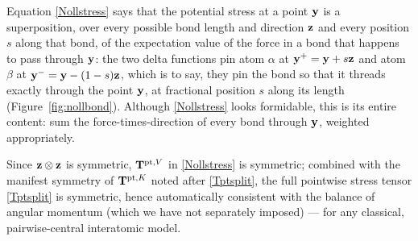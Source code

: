 \begin{remark}
	Equation \eqref{Nollstress} says that the potential stress at a point $\mathbf{y}$ is a superposition, over every possible bond length and direction $\mathbf{z}$ and every position $s$ along that bond, of the expectation value of the force in a bond that happens to pass through $\mathbf{y}$: the two delta functions pin atom $\alpha$ at $\mathbf{y}^+=\mathbf{y}+s\mathbf{z}$ and atom $\beta$ at $\mathbf{y}^-=\mathbf{y}-(1-s)\mathbf{z}$, which is to say, they pin the bond so that it threads exactly through the point $\mathbf{y}$, at fractional position $s$ along its length (Figure~\ref{fig:nollbond}). Although \eqref{Nollstress} looks formidable, this is its entire content: sum the force-times-direction of every bond through $\mathbf{y}$, weighted appropriately.
\end{remark}

\begin{remark}[Symmetry]
	Since $\mathbf{z}\otimes\mathbf{z}$ is symmetric, $\mathbf{T}^{{\rm pt},V}$ in \eqref{Nollstress} is symmetric; combined with the manifest symmetry of $\mathbf{T}^{{\rm pt},K}$ noted after \eqref{Tptsplit}, the full pointwise stress tensor \eqref{Tptsplit} is symmetric, hence automatically consistent with the balance of angular momentum (which we have not separately imposed) --- for any classical, pairwise-central interatomic model.
\end{remark}

